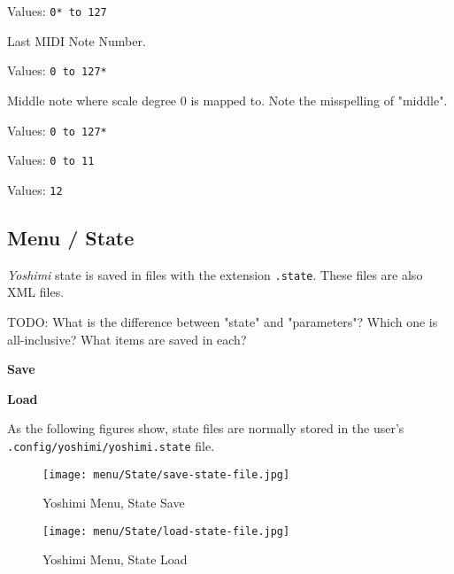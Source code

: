    Values: \texttt{0* to 127}

   Last MIDI Note Number.

   Values: \texttt{0 to 127*}

   Middle note where scale degree 0 is mapped to.
   Note the misspelling of 
   "middle".

   Values: \texttt{0 to 127*}


   Values: \texttt{0 to 11}


   Values: \texttt{12}

\subsection{Menu / State}
\label{subsec:menu_state}

   \textsl{Yoshimi} state is saved in files with the extension
   \texttt{.state}.  These files are also XML files.

TODO: What is the difference between "state" and "parameters"?
   Which one is all-inclusive?  What items are saved in each?

   \begin{enumber}
      \item \textbf{Save}
      \item \textbf{Load}
   \end{enumber}

   As the following figures show, state files are normally stored in the
   user's \texttt{.config/yoshimi/yoshimi.state} file.

\begin{figure}[H]
   \centering 
   \texttt{[image: menu/State/save-state-file.jpg]}
   \caption{Yoshimi Menu, State Save}
   \label{fig:yoshimi_menu_state_save}
\end{figure}

\begin{figure}[H]
   \centering 
   \texttt{[image: menu/State/load-state-file.jpg]}
   \caption{Yoshimi Menu, State Load}
   \label{fig:yoshimi_menu_state_load}
\end{figure}

